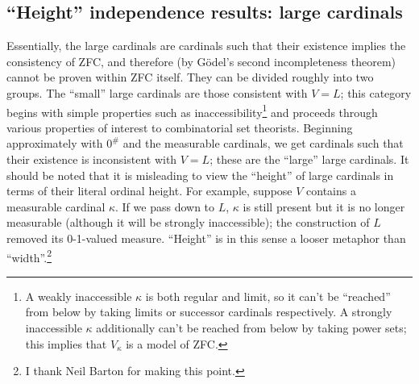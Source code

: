 \documentclass[letterpaper,12pt]{article}
\begin{document}
\subsection{``Height'' independence results: large cardinals}
\label{height}
Essentially, the large cardinals are cardinals such that their existence implies the consistency of ZFC, and therefore (by G\"odel's second incompleteness theorem) cannot be proven within ZFC itself. They can be divided roughly into two groups. The ``small'' large cardinals are those consistent with $V = L$; this category begins with simple properties such as inaccessibility\footnote{A weakly inaccessible $\kappa$ is both regular and limit, so it can't be ``reached'' from below by taking limits or successor cardinals respectively. A strongly inaccessible $\kappa$ additionally can't be reached from below by taking power sets; this implies that $V_\kappa$ is a model of ZFC.} and proceeds through various properties of interest to combinatorial set theorists. Beginning approximately with $0^\#$ and the measurable cardinals, we get cardinals such that their existence is inconsistent with $V = L$; these are the ``large'' large cardinals. It should be noted that it is misleading to view the ``height'' of large cardinals in terms of their literal ordinal height. For example, suppose $V$ contains a measurable cardinal $\kappa$. If we pass down to $L$, $\kappa$ is still present but it is no longer  measurable (although it will be strongly inaccessible); the construction of $L$ removed its 0-1-valued measure. ``Height'' is in this sense a looser metaphor than ``width''.\footnote{I thank Neil Barton for making this point.}
\end{document}
